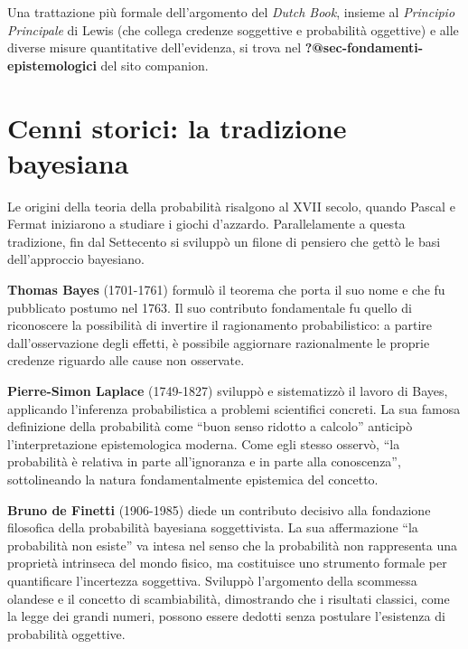 \documentclass[
  letterpaper,
  DIV=11,
  numbers=noendperiod,
  oneside]{scrreprt}
\theoremstyle{definition}
\theoremstyle{plain}
\theoremstyle{definition}
\theoremstyle{remark}
\begin{document}
\begin{tcolorbox}[enhanced jigsaw, arc=.35mm, breakable, colbacktitle=quarto-callout-tip-color!10!white, opacityback=0, toprule=.15mm, rightrule=.15mm, colback=white, opacitybacktitle=0.6, leftrule=.75mm, coltitle=black, bottomtitle=1mm, left=2mm, toptitle=1mm, title=\textcolor{quarto-callout-tip-color}{\faLightbulb}\hspace{0.5em}{Per approfondire}, titlerule=0mm, bottomrule=.15mm, colframe=quarto-callout-tip-color-frame]

Una trattazione più formale dell'argomento del \emph{Dutch Book},
insieme al \emph{Principio Principale} di Lewis (che collega credenze
soggettive e probabilità oggettive) e alle diverse misure quantitative
dell'evidenza, si trova nel \textbf{?@sec-fondamenti-epistemologici} del
sito companion.

\end{tcolorbox}

\section{Cenni storici: la tradizione
bayesiana}\label{cenni-storici-la-tradizione-bayesiana}

Le origini della teoria della probabilità risalgono al XVII secolo,
quando Pascal e Fermat iniziarono a studiare i giochi d'azzardo.
Parallelamente a questa tradizione, fin dal Settecento si sviluppò un
filone di pensiero che gettò le basi dell'approccio bayesiano.

\textbf{Thomas Bayes} (1701-1761) formulò il teorema che porta il suo
nome e che fu pubblicato postumo nel 1763. Il suo contributo
fondamentale fu quello di riconoscere la possibilità di invertire il
ragionamento probabilistico: a partire dall'osservazione degli effetti,
è possibile aggiornare razionalmente le proprie credenze riguardo alle
cause non osservate.

\textbf{Pierre-Simon Laplace} (1749-1827) sviluppò e sistematizzò il
lavoro di Bayes, applicando l'inferenza probabilistica a problemi
scientifici concreti. La sua famosa definizione della probabilità come
``buon senso ridotto a calcolo'' anticipò l'interpretazione
epistemologica moderna. Come egli stesso osservò, ``la probabilità è
relativa in parte all'ignoranza e in parte alla conoscenza'',
sottolineando la natura fondamentalmente epistemica del concetto.

\textbf{Bruno de Finetti} (1906-1985) diede un contributo decisivo alla
fondazione filosofica della probabilità bayesiana soggettivista. La sua
affermazione ``la probabilità non esiste'' va intesa nel senso che la
probabilità non rappresenta una proprietà intrinseca del mondo fisico,
ma costituisce uno strumento formale per quantificare l'incertezza
soggettiva. Sviluppò l'argomento della scommessa olandese e il concetto
di scambiabilità, dimostrando che i risultati classici, come la legge
dei grandi numeri, possono essere dedotti senza postulare l'esistenza di
probabilità oggettive.
\end{document}
